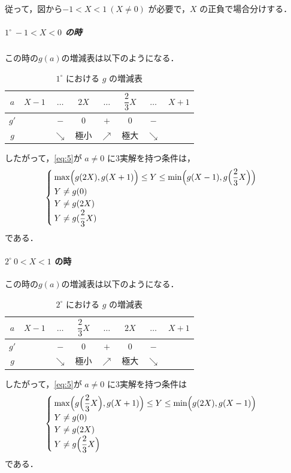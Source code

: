 \documentclass[../../main.tex]{subfiles}
\begin{document}
従って，図から$-1 < X < 1 \ (X \ne 0)$ が必要で，$X$ の正負で場合分けする．

\subparagraph{$1^\circ \ -1 < X < 0$ の時}

この時の$g(a)$の増減表は以下のようになる．

\begin{table}[htb]
  \centering
  \begin{tabular}{c|c|c|c|c|c|c|c}
    $a$ & $X-1$ & $\dots$ & $2X$ & $\dots$ & $\dfrac{2}{3}X$ & $\dots$ & $X+1$ \\ \hline
    $g'$ & & $-$ & $0$ & $+$ & $0$ & $-$ & \\ \hline
    $g$ & & $\searrow$ & 極小 & $\nearrow$ & 極大 & $\searrow$ &
  \end{tabular}
  \caption{$1^\circ$ における $g$ の増減表}
\end{table}

したがって，\cref{eq:5}が $a \ne 0$ に3実解を持つ条件は，
\begin{align}
  \begin{cases}
    \max\Bigl(g(2X), g(X+1)\Bigr) \le Y \le \min\Bigl(g(X-1), g\Bigl(\dfrac{2}{3}X\Bigr)\Bigr) \\
    Y \ne g(0) \\
    Y \ne g(2X) \\
    Y \ne g(\dfrac{2}{3}X)
  \end{cases}\label{eq:6}
\end{align}
である．

\paragraph{$2^\circ \ 0 < X < 1$ の時}

この時の$g(a)$の増減表は以下のようになる．

\begin{table}[htb]
  \centering
  \begin{tabular}{c|c|c|c|c|c|c|c}
    $a$ & $X-1$ & $\dots$ & $\dfrac{2}{3}X$ & $\dots$ & $2X$ & $\dots$ & $X+1$ \\ \hline
    $g'$ & & $-$ & $0$ & $+$ & $0$ & $-$ & \\ \hline
    $g$ & & $\searrow$ & 極小 & $\nearrow$ & 極大 & $\searrow$ &
  \end{tabular}
  \caption{$2^\circ$ における $g$ の増減表}
\end{table}

したがって，\cref{eq:5}が $a \ne 0$ に3実解を持つ条件は
\begin{align}
  \begin{cases}
    \max\Bigl(g\Bigl(\dfrac{2}{3}X\Bigr), g(X+1)\Bigr) \le Y \le \min\Bigl(g(2X), g(X-1)\Bigr) \\
    Y \ne g(0) \\
    Y \ne g(2X) \\
    Y \ne g\Bigl(\dfrac{2}{3}X\Bigr)
  \end{cases} \label{eq:7}
\end{align}
である．
\casesend
\end{document}
